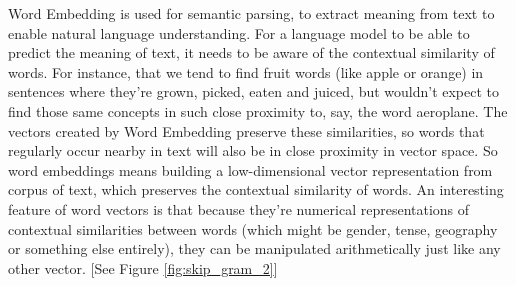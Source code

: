 Word Embedding is used for semantic parsing, to extract meaning from text to enable natural language understanding. For a language model to be able to predict the meaning of text, it needs to be aware of the contextual similarity of words. For instance, that we tend to find fruit words (like apple or orange) in sentences where they’re grown, picked, eaten and juiced, but wouldn’t expect to find those same concepts in such close proximity to, say, the word aeroplane.
The vectors created by Word Embedding preserve these similarities, so words that regularly occur nearby in text will also be in close proximity in vector space.
So word embeddings means building a low-dimensional vector representation from corpus of text, which preserves the contextual similarity of words. An interesting feature of word vectors is that because they’re numerical representations of contextual similarities between words (which might be gender, tense, geography or something else entirely), they can be manipulated arithmetically just like any other vector. [See Figure \ref{fig:skip_gram_2}] \\
